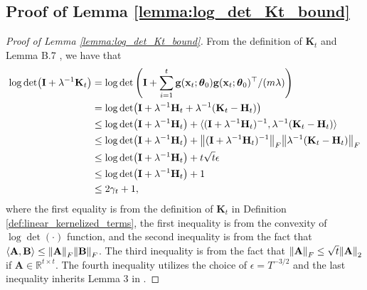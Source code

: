 \subsection{Proof of Lemma \ref{lemma:log_det_Kt_bound}}
\label{log_det_Kt_bound_proof}
\begin{proof}[Proof of Lemma \ref{lemma:log_det_Kt_bound}]

From the definition of $\mathbf{K}_t$ and Lemma B.7 \cite{zhou2020neural}, we have that
\begin{equation*}
\begin{split}
    \log \det(\mathbf{I}+\lambda^{-1}\mathbf{K}_{t})
    & = \log\det \left(\mathbf{I}+\sum_{i=1}^{t}\mathbf{g}({\mathbf{x}_t};\boldsymbol{\theta}_0)\mathbf{g}({\mathbf{x}_t};\boldsymbol{\theta}_0)^\top/(m\lambda)\right) \\
    & = \log \det(\mathbf{I}+\lambda^{-1}\mathbf{H}_t + \lambda^{-1}(\mathbf{K}_t - \mathbf{H}_t))\\
    & \leq \log \det (\mathbf{I}+\lambda^{-1}\mathbf{H}_t)  + \langle (\mathbf{I}+\lambda^{-1}\mathbf{H}_t)^{-1}, \lambda^{-1}(\mathbf{K}_t - \mathbf{H}_t) \rangle \\
    & \leq \log \det (\mathbf{I}+\lambda^{-1}\mathbf{H}_t)  + \norm{(\mathbf{I}+\lambda^{-1}\mathbf{H}_t)^{-1}}_F \norm{ \lambda^{-1}(\mathbf{K}_t - \mathbf{H}_t)}_F \\
    & \leq \log \det (\mathbf{I}+\lambda^{-1}\mathbf{H}_t) + t\sqrt{t} \epsilon \\
    & \leq \log \det (\mathbf{I}+\lambda^{-1}\mathbf{H}_t) + 1 \\
    & \leq 2 \gamma_t + 1, 
\end{split}
\end{equation*}
where the first equality is from the definition of $\mathbf{K}_t$ in Definition \ref{def:linear_kernelized_terms}, the first inequality is from the convexity of $\log \det(\cdot)$ function,
and the second inequality is from the fact that $\langle \mathbf{A}, \mathbf{B} \rangle \le \norm{\mathbf{A}}_F \norm{\mathbf{B}}_F$. The third inequality is
from the fact that $\norm{\mathbf{A}}_F \le \sqrt{t} \norm{\mathbf{A}}_2$ if $\mathbf{A} \in \mathbb{R}^{t \times t}$. The fourth inequality utilizes the choice of $\epsilon = T^{-3/2}$ and the last inequality inherits Lemma 3 in \cite{chowdhury2017kernelized}.
\end{proof}

